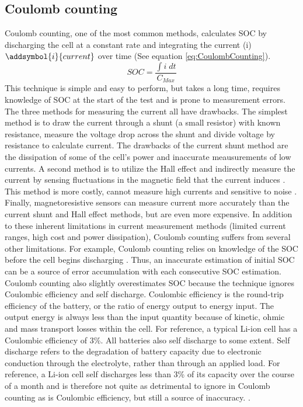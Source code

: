 		\subsection{Coulomb counting}
Coulomb counting, one of the most common methods, calculates SOC by discharging the cell at a constant rate and integrating the current (i) $\addsymbol{i}{current}$ over time (See equation \ref{eq:CoulombCounting}).
\begin{equation}\label{eq:CoulombCounting}
SOC = \frac{\int i\;dt}{C_{Max}}
\end{equation}
This technique is simple and easy to perform, but takes a long time, requires knowledge of SOC at the start of the test and is prone to measurement errors.
The three methods for measuring the current all have drawbacks. The simplest method is to  draw the current through a shunt (a small resistor\cite{Shunts}) with known resistance,  measure the voltage drop across the shunt and divide voltage by resistance to calculate current. The drawbacks of the current shunt method are the dissipation of some of the cell's power and inaccurate meausurements of low currents. A second method is to utilize the Hall effect and indirectly measure the current by sensing fluctuations in the magnetic field that the current induces \cite{HallEffect}. This method is more costly, cannot measure high currents and sensitive to noise \cite{BUSOCDetermination}. Finally, magnetoresistive sensors can measure current more accurately than the current shunt and Hall effect methods, but are even more expensive\cite{BUSOCDetermination}. In addition to these inherent limitations in current measurement methods (limited current ranges, high cost and power dissipation), Coulomb counting suffers from several other limitations. For example, Coulomb counting relies on knowledge of the SOC before the cell begins discharging \cite{BUSOCDetermination}. Thus, an inaccurate estimation of initial SOC can be a source of error accumulation with each consecutive SOC estimation. Coulomb counting also slightly overestimates SOC because the technique ignores Coulombic efficiency and self discharge. Coulombic efficiency is the round-trip efficiency of the battery, or the ratio of energy output  to energy input. The output energy is always less than the input quantity because of kinetic, ohmic and mass transport losses within the cell. For reference, a typical Li-ion cell has a Coulombic efficiency of 3\%. All batteries also self discharge to some extent. Self discharge refers to the degradation of battery capacity due to electronic conduction through the electrolyte, rather than through an applied load. For reference, a Li-ion cell self discharges less than 3\% of its capacity over the course of a month and is therefore not quite as detrimental to ignore in Coulomb counting as is Coulombic efficiency, but still a source of inaccuracy. %
\cite{BUSOCDetermination}.
